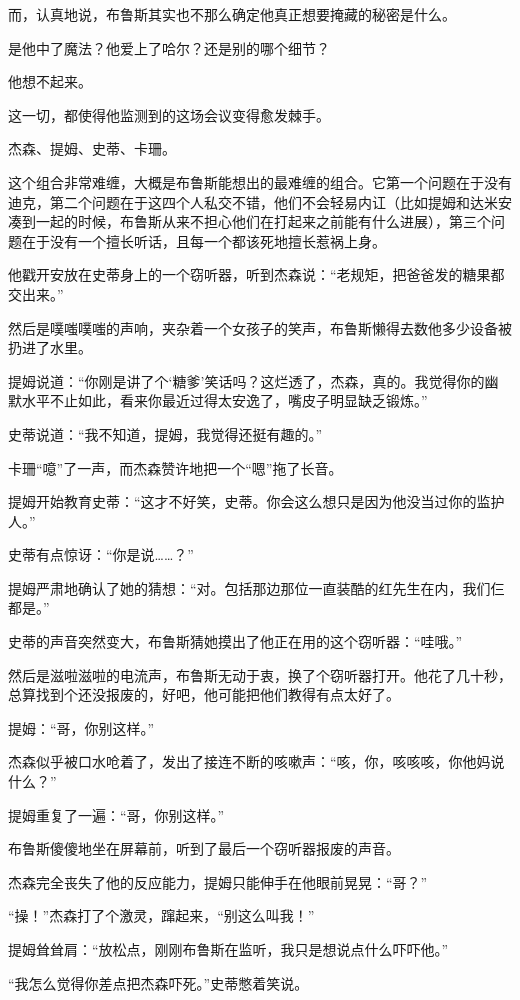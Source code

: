 \documentclass[../main.tex]{subfiles}
\begin{document}
而，认真地说，布鲁斯其实也不那么确定他真正想要掩藏的秘密是什么。

是他中了魔法？他爱上了哈尔？还是别的哪个细节？

他想不起来。

这一切，都使得他监测到的这场会议变得愈发棘手。

杰森、提姆、史蒂、卡珊。

这个组合非常难缠，大概是布鲁斯能想出的最难缠的组合。它第一个问题在于没有迪克，第二个问题在于这四个人私交不错，他们不会轻易内讧（比如提姆和达米安凑到一起的时候，布鲁斯从来不担心他们在打起来之前能有什么进展），第三个问题在于没有一个擅长听话，且每一个都该死地擅长惹祸上身。

他戳开安放在史蒂身上的一个窃听器，听到杰森说：“老规矩，把爸爸发的糖果都交出来。”

然后是噗嗤噗嗤的声响，夹杂着一个女孩子的笑声，布鲁斯懒得去数他多少设备被扔进了水里。

提姆说道：“你刚是讲了个`糖爹'笑话吗？这烂透了，杰森，真的。我觉得你的幽默水平不止如此，看来你最近过得太安逸了，嘴皮子明显缺乏锻炼。”

史蒂说道：“我不知道，提姆，我觉得还挺有趣的。”

卡珊“噫”了一声，而杰森赞许地把一个“嗯”拖了长音。

提姆开始教育史蒂：“这才不好笑，史蒂。你会这么想只是因为他没当过你的监护人。”

史蒂有点惊讶：“你是说……？”

提姆严肃地确认了她的猜想：“对。包括那边那位一直装酷的红先生在内，我们仨都是。”

史蒂的声音突然变大，布鲁斯猜她摸出了他正在用的这个窃听器：“哇哦。”

然后是滋啦滋啦的电流声，布鲁斯无动于衷，换了个窃听器打开。他花了几十秒，总算找到个还没报废的，好吧，他可能把他们教得有点太好了。

提姆：“哥，你别这样。”

杰森似乎被口水呛着了，发出了接连不断的咳嗽声：“咳，你，咳咳咳，你他妈说什么？”

提姆重复了一遍：“哥，你别这样。”

布鲁斯傻傻地坐在屏幕前，听到了最后一个窃听器报废的声音。

杰森完全丧失了他的反应能力，提姆只能伸手在他眼前晃晃：“哥？”

“操！”杰森打了个激灵，蹿起来，“别这么叫我！”

提姆耸耸肩：“放松点，刚刚布鲁斯在监听，我只是想说点什么吓吓他。”

“我怎么觉得你差点把杰森吓死。”史蒂憋着笑说。
\end{document}
